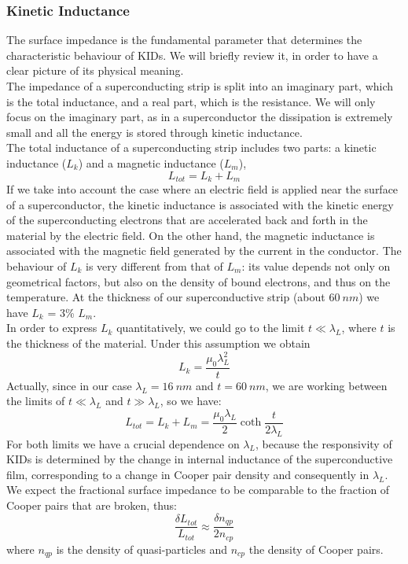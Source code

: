 \documentclass[12pt]{article}
\begin{document}
\subsubsection{Kinetic Inductance}
The surface impedance is the fundamental parameter that determines the characteristic behaviour of KIDs. We will briefly review it, in order to have a clear picture of its physical meaning.\\
The impedance of a superconducting strip is split into an imaginary part, which is the total inductance, and a real part, which is the resistance. We will only focus on the imaginary part, as in a superconductor the dissipation is extremely small and all the energy is stored through kinetic inductance.\\
The total inductance of a superconducting strip includes two parts: a kinetic inductance ($L_k$) and a magnetic inductance ($L_m$),
\begin{equation}
    L_{tot} = L_k + L_m
\end{equation}
If we take into account the case where an electric field is applied near the surface of a superconductor, the kinetic inductance is associated with the kinetic energy of the superconducting electrons that are accelerated back and forth in the material by the electric field. On the other hand, the magnetic inductance is associated with the magnetic field generated by the current in the conductor. The behaviour of $L_k$ is very different from that of $L_m$: its value depends not only on geometrical factors, but also on the density of bound electrons, and thus on the temperature. At the thickness of our superconductive strip (about $60~nm$) we have $L_k$ = 3\% $L_m$.\\
In order to express $L_k$ quantitatively, we could go to the limit $t \ll \lambda_L$, where $t$ is the thickness of the material. Under this assumption we obtain
\begin{equation}
    L_{k} = \frac{\mu_0\lambda_L^2}{t}
\end{equation}
Actually, since in our case $\lambda_L=16~nm$ and $t=60~nm$, we are working between the limits of $t \ll \lambda_L$ and $t \gg \lambda_L$, so we have:
\begin{equation}
    L_{tot} = L_k + L_m = \frac{\mu_0\lambda_L}{2}\coth{\frac{t}{2\lambda_L}}
\end{equation}
For both limits we have a crucial dependence on $\lambda_L$, because the responsivity of KIDs is determined by the change in internal inductance of the superconductive film, corresponding to a change in Cooper pair density and consequently in $\lambda_L$.
We expect the fractional surface impedance to be comparable to the fraction of Cooper pairs that are broken, thus:
\begin{equation}
    \frac{\delta L_{tot}}{L_{tot}} \approx \frac{\delta n_{qp}}{2n_{cp}}
\end{equation}
where $n_{qp}$ is the density of quasi-particles and $n_{cp}$ the density of Cooper pairs.
\end{document}
